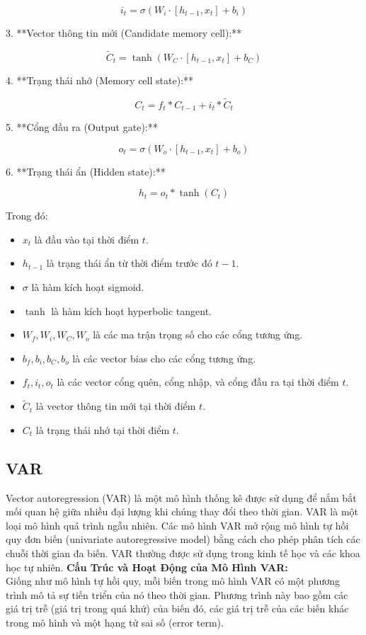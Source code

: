 \documentclass[conference]{IEEEtran}
\begin{document}
	\[
	i_t = \sigma(W_i \cdot [h_{t-1}, x_t] + b_i)
	\]
	
	3. **Vector thông tin mới (Candidate memory cell):**
	
	\[
	\tilde{C}_t = \tanh(W_C \cdot [h_{t-1}, x_t] + b_C)
	\]
	
	4. **Trạng thái nhớ (Memory cell state):**
	
	\[
	C_t = f_t * C_{t-1} + i_t * \tilde{C}_t
	\]
	
	5. **Cổng đầu ra (Output gate):**
	
	\[
	o_t = \sigma(W_o \cdot [h_{t-1}, x_t] + b_o)
	\]
	
	6. **Trạng thái ẩn (Hidden state):**
	
	\[
	h_t = o_t * \tanh(C_t)
	\]
	
	Trong đó:
	\begin{itemize}
		\item \( x_t \) là đầu vào tại thời điểm \( t \).
		\item \( h_{t-1} \) là trạng thái ẩn từ thời điểm trước đó \( t-1 \).
		\item \( \sigma \) là hàm kích hoạt sigmoid.
		\item \( \tanh \) là hàm kích hoạt hyperbolic tangent.
		\item \( W_f, W_i, W_C, W_o \) là các ma trận trọng số cho các cổng tương ứng.
		\item \( b_f, b_i, b_C, b_o \) là các vector bias cho các cổng tương ứng.
		\item \( f_t, i_t, o_t \) là các vector cổng quên, cổng nhập, và cổng đầu ra tại thời điểm \( t \).
		\item \( \tilde{C}_t \) là vector thông tin mới tại thời điểm \( t \).
		\item \( C_t \) là trạng thái nhớ tại thời điểm \( t \).
	\end{itemize}
	\subsection{VAR}
	Vector autoregression (VAR) là một mô hình thống kê được sử dụng để nắm bắt mối quan hệ giữa nhiều đại lượng khi chúng thay đổi theo thời gian. VAR là một loại mô hình quá trình ngẫu nhiên. Các mô hình VAR mở rộng mô hình tự hồi quy đơn biến (univariate autoregressive model) bằng cách cho phép phân tích các chuỗi thời gian đa biến. VAR thường được sử dụng trong kinh tế học và các khoa học tự nhiên.
	\textbf{Cấu Trúc và Hoạt Động của Mô Hình VAR:}\\
	Giống như mô hình tự hồi quy, mỗi biến trong mô hình VAR có một phương trình mô tả sự tiến triển của nó theo thời gian. Phương trình này bao gồm các giá trị trễ (giá trị trong quá khứ) của biến đó, các giá trị trễ của các biến khác trong mô hình và một hạng tử sai số (error term).
	
\end{document}
